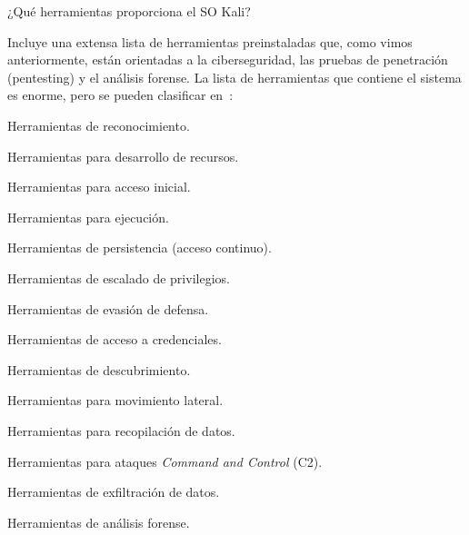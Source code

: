 ¿Qué herramientas proporciona el SO Kali?

Incluye una extensa lista de herramientas preinstaladas que, como vimos anteriormente, están orientadas a la ciberseguridad, las pruebas de penetración (pentesting) y el análisis forense. La lista de herramientas que contiene el sistema es enorme, pero se pueden clasificar en~\cite{kali_docs}:
\begin{itemizeColor}
    \item Herramientas de reconocimiento.
    \item Herramientas para desarrollo de recursos.
    \item Herramientas para acceso inicial.
    \item Herramientas para ejecución.
    \item Herramientas de persistencia (acceso continuo).
    \item Herramientas de escalado de privilegios.
    \item Herramientas de evasión de defensa.
    \item Herramientas de acceso a credenciales.
    \item Herramientas de descubrimiento.
    \item Herramientas para movimiento lateral.
    \item Herramientas para recopilación de datos.
    \item Herramientas para ataques \textit{Command and Control} (C2).
    \item Herramientas de exfiltración de datos.
    \item Herramientas de análisis forense.
\end{itemizeColor}
